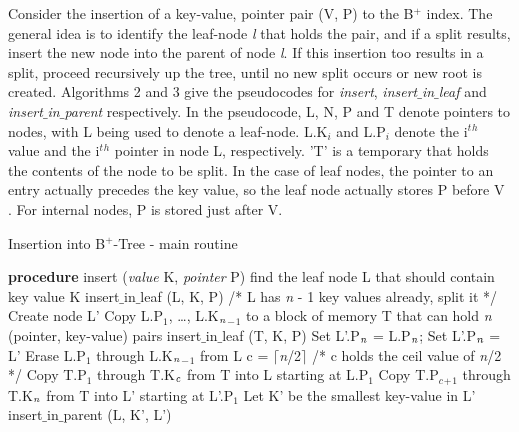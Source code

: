 \documentclass[11pt, oneside, a4paper]{article}
\begin{document}
Consider the insertion of a key-value, pointer pair (V, P) to the B$^+$ index.  The general idea is to identify the leaf-node \emph{l} that holds the pair, and if a split results, insert the new node into the parent of node \emph{l}.  If this insertion too results in a split, proceed recursively up the tree, until no new split occurs or new root is created.  Algorithms 2 and 3 give the pseudocodes for \emph{insert}, \emph{insert$\_$in$\_$leaf} and \emph{insert$\_$in$\_$parent} respectively.  In the pseudocode, L, N, P and T denote pointers to nodes, with L being used to denote a leaf-node.  L.K$_i$ and L.P$_i$ denote the i$^t$$^h$ value and the i$^t$$^h$ pointer in node L, respectively. 'T' is a temporary that holds the contents of the node to be split.  In the case of leaf nodes, the pointer to an entry actually precedes the key value, so the leaf node actually stores P before V . For internal nodes, P is stored just after V.

\begin{algorithm}
\caption{Insertion into B$^+$-Tree - main routine}
\label {alg2}
\begin{algorithmic}[1]
\STATE \textbf{procedure} insert (\emph{value} K, \emph{pointer} P)
\STATE find the leaf node L that should contain key value K
\STATE insert$\_$in$\_$leaf (L, K, P)
\ELSE
\STATE /* L has \emph{n} - 1 key values already, split it */
\STATE Create node L'
\STATE Copy L.P$_1$, \ldots, L.K$_\emph{n}$$_-$$_1$ to a block of memory T that can hold \emph{n} (pointer, key-value) pairs
\STATE insert$\_$in$\_$leaf (T, K, P)
\STATE Set L'.P$_\emph{n}$ = L.P$_\emph{n}$; Set L'.P$_\emph{n}$ = L'
\STATE Erase L.P$_1$ through L.K$_\emph{n}$$_-$$_1$ from L
\STATE c = $\lceil$\emph{n}/2$\rceil$  /* c holds the ceil value of \emph{n}/2 */
\STATE Copy T.P$_1$ through T.K$_\emph{c}$ from T into L starting at L.P$_1$
\STATE Copy T.P$_c$$_+$$_1$ through T.K$_\emph{n}$ from T into L' starting at L'.P$_1$
\STATE Let K' be the smallest key-value in L'
\STATE insert$\_$in$\_$parent (L, K', L')
\ENDIF
\end{algorithmic}
\end{algorithm}
\end{document}

